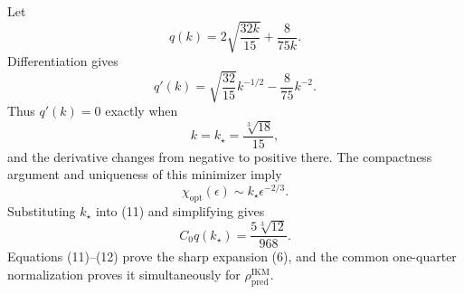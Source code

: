 Let
\[
 q(k)=2\sqrt{\frac{32k}{15}}+\frac8{75k}.
\]
Differentiation gives
\[
 q'(k)=\sqrt{\frac{32}{15}}k^{-1/2}-\frac8{75}k^{-2}.
\]
Thus \(q'(k)=0\) exactly when
\[
 k=k_\star=\frac{\sqrt[3]{18}}{15},
\]
and the derivative changes from negative to positive there.  The compactness argument and uniqueness of this minimizer imply
\[
 \chi_{\mathrm{opt}}(\epsilon)\sim k_\star\epsilon^{-2/3}. \tag{12}
\]
Substituting \(k_\star\) into (11) and simplifying gives
\[
 C_0q(k_\star)=\frac{5\sqrt[3]{12}}{968}.
\]
Equations (11)--(12) prove the sharp expansion (6), and the common one-quarter normalization proves it simultaneously for \(\rho_{\mathrm{pred}}^{\mathrm{IKM}}\).